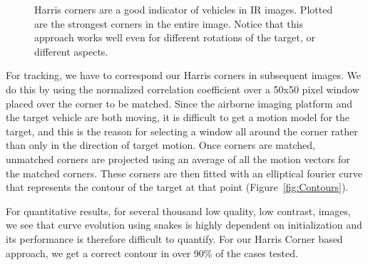 \documentclass{article}
\begin{document}
\begin{figure}[t]
			\centering
			\caption{Harris corners are a good indicator of vehicles in IR images. Plotted are the strongest corners in the entire image.  Notice that this approach works well even for different rotations of the target, or different aspects.} 	
			\label{fig:Corners}	
\end{figure}

For tracking, we have to correspond our Harris corners in subsequent images.  We do this by using the normalized correlation coefficient over a 50x50 pixel window placed over the corner to be matched.  Since the airborne imaging platform and the target vehicle are both moving, it is difficult to get a motion model for the target, and this is the reason for selecting a window all around the corner rather than only in the direction of target motion.  Once corners are matched, unmatched corners are projected using an average of all the motion vectors for the matched corners.  These corners are then fitted with an elliptical fourier curve that represents the contour of the target at that point (Figure~\ref{fig:Contours}).

For quantitative results, for several thousand low quality, low contrast, images, we see that curve evolution using snakes is highly dependent on initialization and its performance is therefore difficult to quantify.  For our Harris Corner based approach, we get a correct contour in over 90\% of the cases tested.
\end{document}
